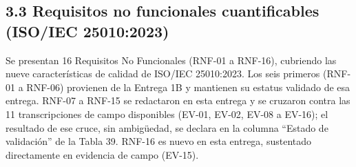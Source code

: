 \subsection*{3.3 Requisitos no funcionales cuantificables (ISO/IEC 25010:2023)}


Se presentan 16 Requisitos No Funcionales (RNF-01 a RNF-16), cubriendo las nueve características de calidad de ISO/IEC 25010:2023. Los seis primeros (RNF-01 a RNF-06) provienen de la Entrega 1B y mantienen su estatus validado de esa entrega. RNF-07 a RNF-15 se redactaron en esta entrega y se cruzaron contra las 11 transcripciones de campo disponibles (EV-01, EV-02, EV-08 a EV-16); el resultado de ese cruce, sin ambigüedad, se declara en la columna ``Estado de validación'' de la Tabla 39. RNF-16 es nuevo en esta entrega, sustentado directamente en evidencia de campo (EV-15).


